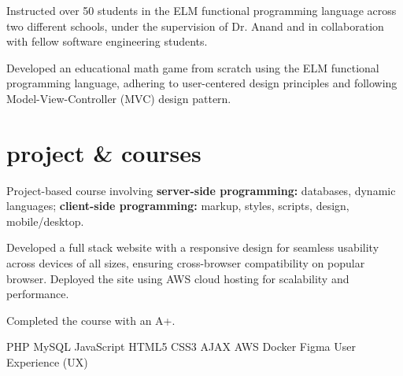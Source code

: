 \documentclass[]{farzad-resume}
\begin{document}
\begin{minipage}[t]{\textwidth}
\begin{skillsection}
\end{skillsection}


\sectionsep

\vspace{\topsep}
\begin{tightemize}
	{\fontsize{8}{10.4} \selectfont
	\item Instructed over 50 students in the ELM functional programming language across two different schools, under the supervision of Dr. Anand and in collaboration with fellow software engineering students.

 	\item Developed an educational math game from scratch using the ELM functional programming language, adhering to user-centered design principles and following Model-View-Controller (MVC) design pattern.}
\end{tightemize}
\sectionsep

\section {project \& courses \fontsize{9}{10.8} \selectfont}

\vspace{\topsep}
\begin{tightemize}
{\fontsize{8}{10.4} \selectfont 
	\item Project-based course involving \textbf{server-side programming:} databases, dynamic languages; \textbf{ client-side programming:} markup, styles, scripts, design, mobile/desktop.
	\item Developed a full stack website with a responsive design for seamless usability across devices of all sizes, ensuring cross-browser compatibility on popular browser. Deployed the site using AWS cloud hosting for scalability and performance.
	\item Completed the course with an A+.}
\end{tightemize}

\begin{skillsection}
{ PHP \textbullet{} MySQL \textbullet{} JavaScript \textbullet{} HTML5 \textbullet{} CSS3 \textbullet{}AJAX \textbullet{} AWS \textbullet{} Docker \textbullet{} Figma \textbullet{} User Experience (UX)}
\end{skillsection}




\end{minipage}
\end{document}
